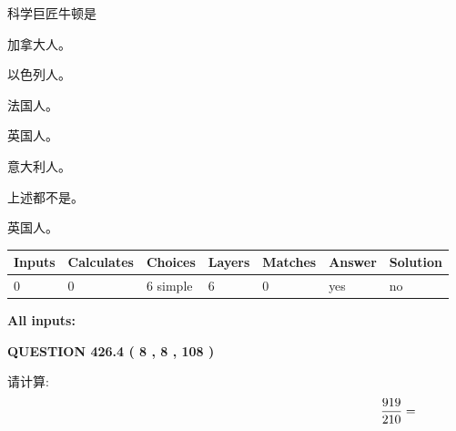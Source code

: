 \documentclass{ctexart}
\begin{document}
  
科学巨匠牛顿是
 
 
加拿大人。
 
 
以色列人。
 
 
法国人。
 
 
英国人。
 
 
意大利人。
 
 
 上述都不是。
 
 
\noindent{}
 
 
英国人。
 
 
\noindent{}
 
 
   
   
   
   
\noindent\begin{tabular}{|l|l|l|l|l|l|l|}
 \hline
Inputs & Calculates & Choices & Layers & Matches & Answer & Solution \\ \hline
 0  & 
 0  & 
 6
  simple  
  & 
 6  & 
 0  & 
  yes & 
  no 
  \\ \hline
 \end{tabular}
   
   
   
   
\noindent{}
   
   
   
   
\noindent\vspace{0.1in}\hspace{-0.08in} {\textbf{\Large{All inputs: }}}
   
   
  
\vspace{0.2in}
  
{\textbf{\Large{QUESTION
426.4 
 ( 8 , 8 , 108 )
}}}
  
  
 
请计算:
\begin{equation}
\frac { %
919 }  {  %
210} = \nonumber
\end{equation}
 
 
 
\noindent{}
 
\end{document}
